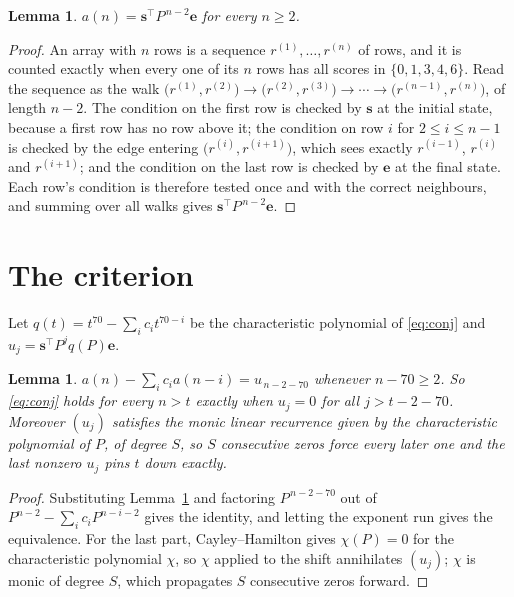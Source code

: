 \documentclass[11pt,a4paper]{article}
\theoremstyle{plain}
\newtheorem{lemma}[theorem]{Lemma}
\theoremstyle{definition}
\begin{document}
\begin{lemma}\label{lem:walk}
$a(n)=\mathbf{s}^{\!\top}P^{\,n-2}\mathbf{e}$ for every $n\ge2$.
\end{lemma}

\begin{proof}
An array with $n$ rows is a sequence $r^{(1)},\dots,r^{(n)}$ of rows, and it is counted
exactly when every one of its $n$ rows has all scores in $\{0,1,3,4,6\}$. Read the sequence as the
walk $\bigl(r^{(1)},r^{(2)}\bigr)\to\bigl(r^{(2)},r^{(3)}\bigr)\to\cdots\to
\bigl(r^{(n-1)},r^{(n)}\bigr)$, of length $n-2$. The condition on the first row is
checked by $\mathbf{s}$ at the initial state, because a first row has no row above it; the
condition on row $i$ for $2\le i\le n-1$ is checked by the edge entering
$\bigl(r^{(i)},r^{(i+1)}\bigr)$, which sees exactly $r^{(i-1)}$, $r^{(i)}$ and
$r^{(i+1)}$; and the condition on the last row is checked by $\mathbf{e}$ at the final
state. Each row's condition is therefore tested once and with the correct neighbours, and
summing over all walks gives $\mathbf{s}^{\!\top}P^{\,n-2}\mathbf{e}$.
\end{proof}

\section{The criterion}

Let $q(t)=t^{70}-\sum_i c_i t^{70-i}$ be the characteristic polynomial of
\eqref{eq:conj} and $u_j=\mathbf{s}^{\!\top}P^{j}q(P)\mathbf{e}$.

\begin{lemma}\label{lem:crit}
$a(n)-\sum_i c_i a(n-i)=u_{\,n-2-70}$ whenever $n-70\ge2$. So \eqref{eq:conj}
holds for every $n>t$ exactly when $u_j=0$ for all $j>t-2-70$. Moreover $(u_j)$
satisfies the monic linear recurrence given by the characteristic polynomial of $P$, of
degree $S$, so $S$ consecutive zeros force every later one and the last nonzero $u_j$ pins
$t$ down exactly.
\end{lemma}

\begin{proof}
Substituting Lemma~\ref{lem:walk} and factoring $P^{\,n-2-70}$ out of
$P^{n-2}-\sum_i c_i P^{n-i-2}$ gives the identity, and letting the exponent run gives the
equivalence. For the last part, Cayley--Hamilton gives $\chi(P)=0$ for the characteristic
polynomial $\chi$, so $\chi$ applied to the shift annihilates $(u_j)$; $\chi$ is monic of
degree $S$, which propagates $S$ consecutive zeros forward.
\end{proof}
\end{document}
